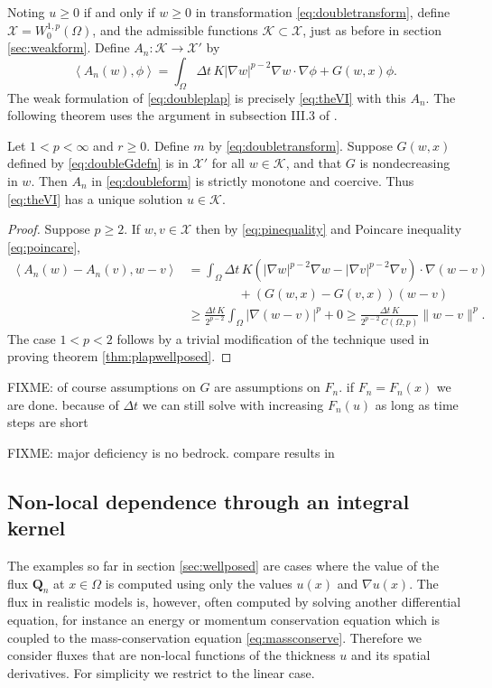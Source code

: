 \documentclass[final,leqno,onefignum,onetabnum]{siamltex1213bueler}
\newcommand\bQ{\mathbf{Q}}
\renewcommand{\grad}{\nabla}
\newcommand{\ip}[2]{\ensuremath{\left<#1,#2\right>}}
\begin{document}
Noting $u\ge 0$ if and only if $w\ge 0$ in transformation \eqref{eq:doubletransform}, define $\mathcal{X} = W_0^{1,p}(\Omega)$, and the admissible functions $\mathcal{K}\subset \mathcal{X}$, just as before in section \ref{sec:weakform}.  Define $A_n: \mathcal{K} \to \mathcal{X}'$ by
\begin{equation}
\ip{A_n(w)}{\phi} = \int_\Omega \Delta t\, K |\grad w|^{p-2} \grad w\cdot \grad \phi + G(w,x)\phi. \label{eq:doubleform}
\end{equation}
The weak formulation of \eqref{eq:doubleplap} is precisely \eqref{eq:theVI} with this $A_n$.  The following theorem uses the argument in subsection III.3 of \cite{KinderlehrerStampacchia1980}.

\medskip
\begin{theorem}
Let $1<p<\infty$ and $r\ge 0$.  Define $m$ by \eqref{eq:doubletransform}.  Suppose $G(w,x)$ defined by \eqref{eq:doubleGdefn} is in $\mathcal{X}'$ for all $w\in\mathcal{K}$, and that $G$ is nondecreasing in $w$.  Then $A_n$ in \eqref{eq:doubleform} is strictly monotone and coercive.  Thus \eqref{eq:theVI} has a unique solution $u\in\mathcal{K}$.
\end{theorem}

\begin{proof}
Suppose $p\ge 2$.  If $w,v\in\mathcal{X}$ then by \eqref{eq:pinequality} and Poincare inequality \eqref{eq:poincare},
\begin{align*}
\ip{A_n(w)-A_n(v)}{w-v} &= \int_\Omega \Delta t\, K \left(|\grad w|^{p-2} \grad w - |\grad v|^{p-2} \grad v\right) \cdot \grad (w-v) \\
  &\qquad\qquad + \left(G(w,x) - G(v,x)\right) (w-v) \\
  &\ge \frac{\Delta t\,K}{2^{p-2}} \int_\Omega |\grad (w-v)|^p + 0 \ge \frac{\Delta t\,K}{2^{p-2}\, C(\Omega,p)} \|w-v\|^p.
\end{align*}
The case $1<p<2$ follows by a trivial modification of the technique used in proving theorem \ref{thm:plapwellposed}.
\end{proof}

FIXME: of course assumptions on $G$ are assumptions on $F_n$.  if $F_n=F_n(x)$ we are done. because of $\Delta t$ we can still solve with increasing $F_n(u)$ as long as time steps are short

FIXME: major deficiency is no bedrock. compare results in \cite{JouvetBueler2012}

\subsection{Non-local dependence through an integral kernel} \label{subsec:nonlocal}   The examples so far in section \ref{sec:wellposed} are cases where the value of the flux $\bQ_n$ at $x\in\Omega$ is computed using only the values $u(x)$ and $\grad u(x)$.  The flux in realistic models is, however, often computed by solving another differential equation, for instance an energy or momentum conservation equation which is coupled to the mass-conservation equation \eqref{eq:massconserve}.  Therefore we consider fluxes that are non-local functions of the thickness $u$ and its spatial derivatives.  For simplicity we restrict to the linear case.
\end{document}
